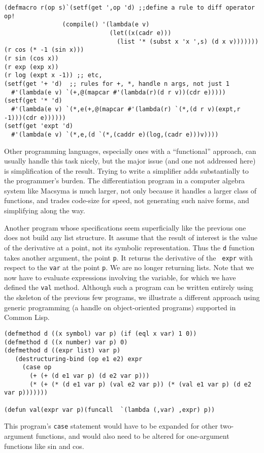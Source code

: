 \documentclass{article}
\begin{document}
{{{{\begin{verbatim}
(defmacro r(op s)`(setf(get ',op 'd) ;;define a rule to diff operator op!
                (compile() '(lambda(e v)
                             (let((x(cadr e)))
                               (list '* (subst x 'x ',s) (d x v)))))))
(r cos (* -1 (sin x)))
(r sin (cos x))
(r exp (exp x))
(r log (expt x -1)) ;; etc, 
(setf(get '+ 'd)  ;; rules for +, *, handle n args, not just 1
  #'(lambda(e v) `(+,@(mapcar #'(lambda(r)(d r v))(cdr e)))))
(setf(get '* 'd)
  #'(lambda(e v) `(*,e(+,@(mapcar #'(lambda(r) `(*,(d r v)(expt,r -1)))(cdr e))))))
(setf(get 'expt 'd)
  #'(lambda(e v) `(*,e,(d `(*,(caddr e)(log,(cadr e)))v))))
\end{verbatim}
Other programming languages, especially ones with a ``functional''
approach, can usually handle this task nicely, but the major issue
(and one not addressed here) is simplification of the result.  Trying
to write a simplifier adds substantially to the programmer's
burden. The differentiation program in a computer algebra system like
Macsyma is much larger, not only because it handles a larger class of
functions, and trades code-size for speed, not generating such naive
forms, and simplifying along the way.

Another program whose specifications seem superficially like the
previous one does not build any list structure.  It assume that the
result of interest is the value of the derivative at a point, not its
symbolic representation.  Thus the {\tt d} function takes another
argument, the point {\tt p}.  It returns the derivative of the {\tt
expr} with respect to the {\tt var} at the point {\tt p}.  We are no
longer returning lists.  Note that we now have to evaluate expressions
involving the variable, for which we have defined the {\tt val}
method.  Although such a program can be written entirely using the
skeleton of the previous few programs, we illustrate a different
approach using generic programming (a handle on object-oriented
programs) supported in Common Lisp.

\begin{verbatim}
(defmethod d ((x symbol) var p) (if (eql x var) 1 0))
(defmethod d ((x number) var p) 0)
(defmethod d ((expr list) var p)
   (destructuring-bind (op e1 e2) expr
     (case op
       (+ (+ (d e1 var p) (d e2 var p)))
       (* (+ (* (d e1 var p) (val e2 var p)) (* (val e1 var p) (d e2 var p))))))) 

(defun val(expr var p)(funcall  `(lambda (,var) ,expr) p))
\end{verbatim}
This program's {\tt case} statement would have to be expanded
for other two-argument functions, and would also need to be
altered for one-argument functions like sin and cos.
}}}}
\end{document}

